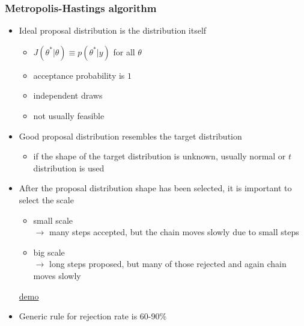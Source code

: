 \documentclass[10pt]{beamer}
\begin{document}
\begin{frame}

\frametitle{ Metropolis-Hastings algorithm}

  \begin{itemize}
  \item Ideal proposal distribution is the distribution itself
    \begin{itemize}
    \item $J(\theta^{*}|\theta)\equiv p(\theta^{*}|y)$ for all
      $\theta$
    \item acceptance probability is $1$
    \item independent draws
    \item not usually feasible
    \end{itemize}
  \item<2-> Good proposal distribution resembles the target distribution
    \begin{itemize}
    \item if the shape of the target distribution is unknown, usually
      normal or $t$ distribution is used
    \end{itemize}
  \item<3-> After the proposal distribution shape has been selected, it is important to select the scale
    \begin{itemize}
    \item small scale \\$\rightarrow$ many steps accepted, but the chain moves slowly due to small steps
    \item big scale \\$\rightarrow$ long steps proposed, but many of
      those rejected and again chain moves slowly
    \end{itemize}
    \begin{center}
  \href{https://chi-feng.github.io/mcmc-demo/app.html?algorithm=RandomWalkMH&target=standard}{demo}
  \end{center}
  \item<4-> Generic rule for rejection rate is 60-90\% %
\end{itemize}

\end{frame}
\end{document}

